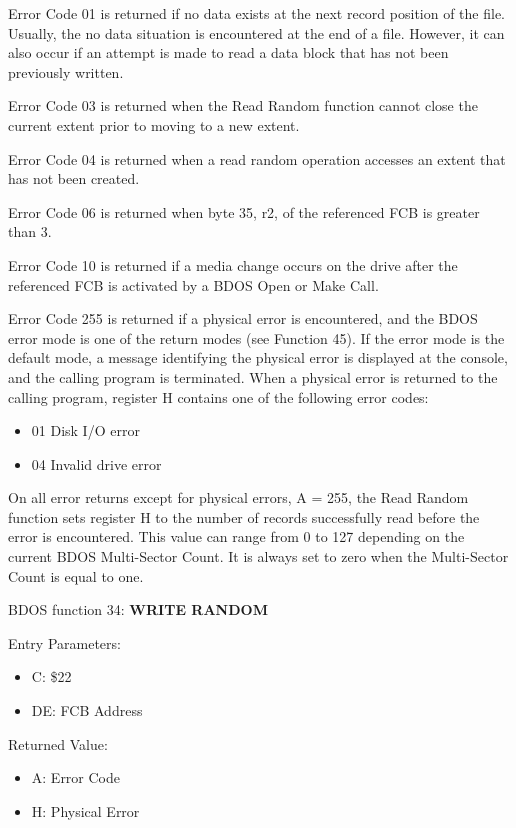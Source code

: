 Error Code 01 is returned if no data exists at the next record
position of the file.  Usually, the no data situation is encountered
at the end of a file. However, it can also occur if an attempt is made
to read a data block that has not been previously written.

Error Code 03 is returned when the Read Random function cannot close
the current extent prior to moving to a new extent.

Error Code 04 is returned when a read random operation accesses an
extent that has not been created.

Error Code 06 is returned when byte 35, r2, of the referenced FCB is
greater than 3.

Error Code 10 is returned if a media change occurs on the drive after
the referenced FCB is activated by a BDOS Open or Make Call.

Error Code 255 is returned if a physical error is encountered, and the
BDOS error mode is one of the return modes (see Function 45). If the
error mode is the default mode, a message identifying the physical
error is displayed at the console, and the calling program is
terminated. When a physical error is returned to the calling program,
register H contains one of the following error codes:

\begin{itemize}
\item 01 Disk I/O error
\item 04 Invalid drive error
\end{itemize}

On all error returns except for physical errors, A = 255, the Read
Random function sets register H to the number of records successfully
read before the error is encountered. This value can range from 0 to
127 depending on the current BDOS Multi-Sector Count. It is always set
to zero when the Multi-Sector Count is equal to one.

BDOS function 34: \textbf{WRITE RANDOM}

Entry Parameters:
\begin{itemize}
\item[] C: \$22
\item[] DE: FCB Address
\end{itemize}

Returned Value:
\begin{itemize}
\item[] A: Error Code
\item[] H: Physical Error
\end{itemize}


